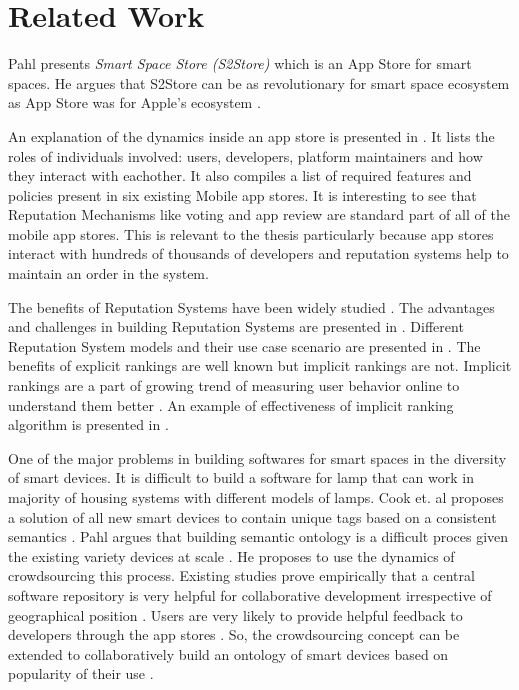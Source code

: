 \chapter{Related Work}

Pahl presents \emph{Smart Space Store (S2Store)} which is an App Store for smart spaces. He argues that S2Store can be as revolutionary for smart space ecosystem as App Store was for Apple's ecosystem \cite{pahl2014distributed}.

An explanation of the dynamics inside an app store is presented in \cite{Jansen}. It lists the roles of individuals involved: users, developers, platform maintainers and how they interact with eachother. It also compiles a list of required features and policies present in six existing Mobile app stores. It is interesting to see that Reputation Mechanisms like voting and app review are standard part of all of the mobile app stores. This is relevant to the thesis particularly because app stores interact with hundreds of thousands of developers \cite{lim2012successful} and reputation systems help to maintain an order in the system.

The benefits of Reputation Systems have been widely studied \cite{Akerlof1970} \cite{Axelrod1984} \cite{Resnick2000} \cite{farmer2010building}. The advantages and challenges in building Reputation Systems are presented in \cite{Resnick2000}. Different Reputation System models and their use case scenario are presented in \cite{farmer2010building}. The benefits of explicit rankings are well known but implicit rankings are not. Implicit rankings are a part of growing trend of measuring user behavior online to understand them better \cite{claypool2001inferring}. An example of effectiveness of implicit ranking algorithm is presented in \cite{girardello2010explicit}.

One of the major problems in building softwares for smart spaces in the diversity of smart devices. It is difficult to build a software for lamp that can work in majority of housing systems with different models of lamps. Cook et. al proposes a solution of all new smart devices to contain unique tags based on a consistent semantics \cite{Cook2012}. Pahl argues that building semantic ontology is a difficult proces given the existing variety devices at scale \cite{pahl2014distributed}. He proposes to use the dynamics of crowdsourcing this process. Existing studies prove empirically that a central software repository is very helpful for collaborative development irrespective of geographical position \cite{dabbish2012social}. Users are very likely to provide helpful feedback to developers through the app stores \cite{pagano2013user}. So, the crowdsourcing concept can be extended to collaboratively build an ontology of smart devices  based on popularity of their use \cite{pahl2014distributed}.

